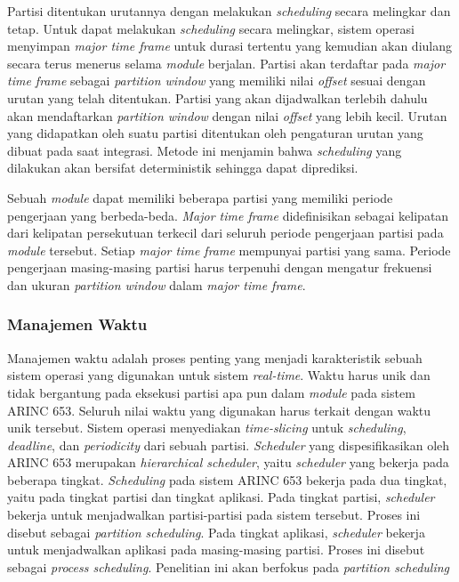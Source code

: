 Partisi ditentukan urutannya dengan melakukan \textit{scheduling} secara melingkar dan tetap.
Untuk dapat melakukan \textit{scheduling} secara melingkar, sistem operasi menyimpan
\textit{major time frame} untuk durasi tertentu yang kemudian akan diulang secara terus menerus
selama \textit{module} berjalan.  Partisi akan terdaftar pada \textit{major time frame} sebagai
\textit{partition window} yang memiliki nilai \textit{offset} sesuai dengan urutan yang telah
ditentukan.  Partisi yang akan dijadwalkan terlebih dahulu akan mendaftarkan \textit{partition
window} dengan nilai \textit{offset} yang lebih kecil.  Urutan yang didapatkan oleh suatu
partisi ditentukan oleh pengaturan urutan yang dibuat pada saat integrasi.  Metode ini menjamin
bahwa \textit{scheduling} yang dilakukan akan bersifat deterministik sehingga dapat diprediksi.

Sebuah \textit{module} dapat memiliki beberapa partisi yang memiliki periode pengerjaan yang
berbeda-beda.  \textit{Major time frame} didefinisikan sebagai kelipatan dari kelipatan
persekutuan terkecil dari seluruh periode pengerjaan partisi pada \textit{module} tersebut.
Setiap \textit{major time frame} mempunyai partisi yang sama.  Periode pengerjaan masing-masing
partisi harus terpenuhi dengan mengatur frekuensi dan ukuran \textit{partition window} dalam
\textit{major time frame}.

\subsubsection{Manajemen Waktu}
\label{section:arinc653_scheduling}

Manajemen waktu adalah proses penting yang menjadi karakteristik sebuah sistem operasi yang
digunakan untuk sistem \textit{real-time}. Waktu harus unik dan tidak bergantung pada eksekusi
partisi apa pun dalam \textit{module} pada sistem ARINC 653. Seluruh nilai waktu yang digunakan
harus terkait dengan waktu unik tersebut. Sistem operasi menyediakan \textit{time-slicing} untuk
\textit{scheduling}, \textit{deadline}, dan \textit{periodicity} dari sebuah partisi.
\textit{Scheduler} yang dispesifikasikan oleh ARINC 653 merupakan \textit{hierarchical
scheduler}, yaitu \textit{scheduler} yang bekerja pada beberapa tingkat. \textit{Scheduling}
pada sistem ARINC 653 bekerja pada dua tingkat, yaitu pada tingkat partisi dan tingkat aplikasi.
Pada tingkat partisi, \textit{scheduler} bekerja untuk menjadwalkan partisi-partisi pada sistem
tersebut. Proses ini disebut sebagai \textit{partition scheduling}. Pada tingkat aplikasi,
\textit{scheduler} bekerja untuk menjadwalkan aplikasi pada masing-masing partisi. Proses ini
disebut sebagai \textit{process scheduling}. Penelitian ini akan berfokus pada \textit{partition
scheduling}


